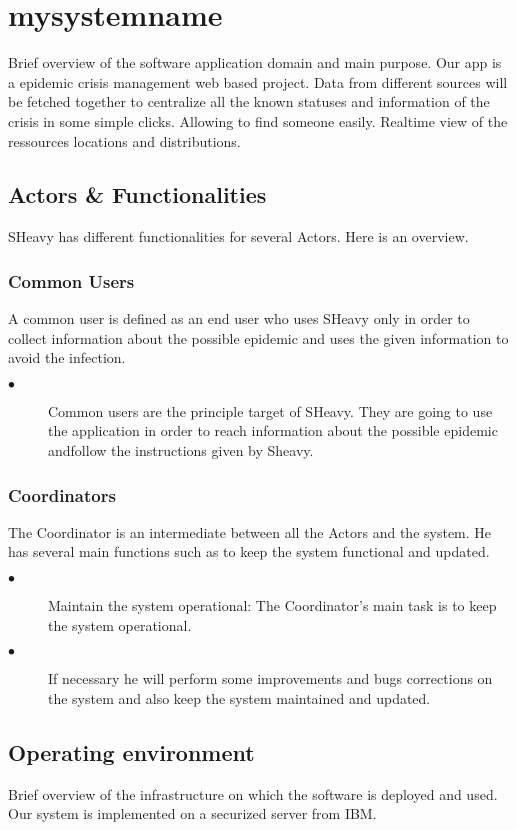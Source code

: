 \section{mysystemname}
Brief overview of the software application domain and main purpose.
Our app is a epidemic crisis management web based project. Data from different
sources will be fetched together to centralize all the known statuses and
information of the crisis in some simple clicks. Allowing to find someone
easily. Realtime view of the ressources locations and distributions.

\subsection{Actors \& Functionalities}
SHeavy has different functionalities for several Actors. Here is an overview.\\

\subsubsection{Common Users}
A common user is defined as an end user who uses SHeavy only in order to
collect information about the possible epidemic and uses the given information
to avoid the infection.
\begin{description}
 \item[$\bullet$] Common users are the principle target of SHeavy. They are
 going to use the application in order to reach information about the possible
 epidemic andfollow the instructions given by Sheavy.
\end{description}

\subsubsection{Coordinators}
The Coordinator is an intermediate between all the Actors and the system. He has
several main functions such as to keep the system functional and updated.
\begin{description}
 \item[$\bullet$] Maintain the system operational: The Coordinator's main task
 is to keep the system operational.
 \item[$\bullet$] If necessary he will perform some improvements and bugs
 corrections on the system and also keep the system maintained and updated.
\end{description} 

\subsection{Operating environment}
Brief overview of the infrastructure on which the software is deployed and used.
Our system is implemented on a securized server from IBM.

